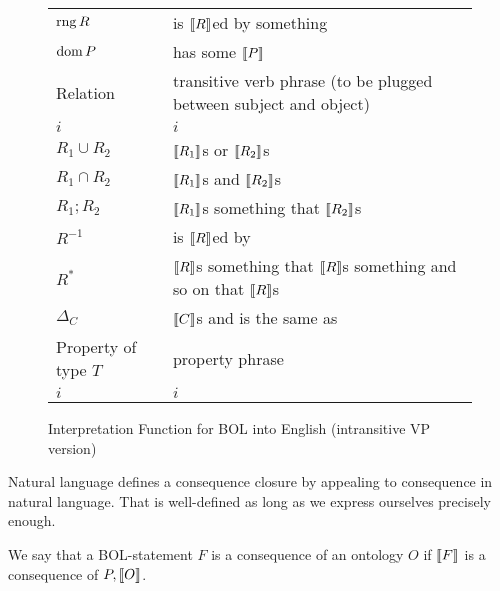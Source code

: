 \begin{figure}
\begin{tabular}{l|l}
$\mathrm{rng}\, R$ & is $\llbracket R\rrbracket$ed by something\\
$\mathrm{dom}\, P$ & has some $\llbracket P\rrbracket$\\
\hline
Relation & transitive verb phrase (to be plugged between subject and object)\\
$i$ & $i$\\
$R_1 \cup R_2$ & $\llbracket R_1\rrbracket$s or $\llbracket R_2\rrbracket$s\\
$R_1 \cap R_2$ & $\llbracket R_1\rrbracket$s and $\llbracket R_2\rrbracket$s\\
$R_1 ; R_2$ & $\llbracket R_1\rrbracket$s something that $\llbracket R_2\rrbracket$s\\
$R^{-1}$    & is $\llbracket R\rrbracket$ed by\\
$R^*$       & $\llbracket R\rrbracket$s something that $\llbracket R\rrbracket$s something and so on that $\llbracket R\rrbracket$s\\
$\Delta_C$  & $\llbracket C\rrbracket$s and is the same as\\
\hline
Property of type $T$ & property phrase\\
$i$ & $i$\\
\end{tabular}
\caption{Interpretation Function for BOL into English (intransitive VP version)}\label{fig:bolsem:eng}
\end{figure}

Natural language defines a consequence closure by appealing to consequence in natural language.
That is well-defined as long as we express ourselves precisely enough.
\begin{definition}
We say that a BOL-statement $F$ is a consequence of an ontology $O$ if $\llbracket F\rrbracket$ is a consequence of $P,\llbracket O\rrbracket$.
\end{definition}

